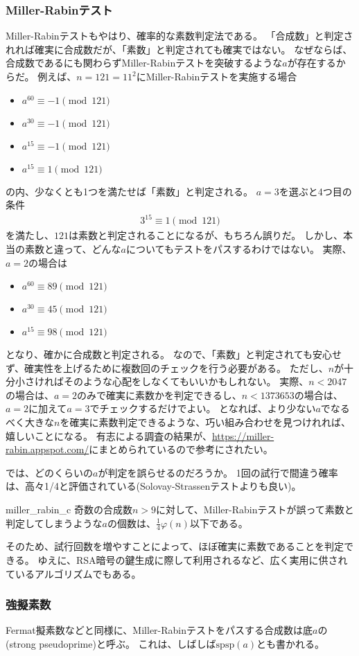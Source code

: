 \subsubsection{Miller-Rabinテスト}
Miller-Rabinテストもやはり、確率的な素数判定法である。
「合成数」と判定されれば確実に合成数だが、「素数」と判定されても確実ではない。
なぜならば、合成数であるにも関わらずMiller-Rabinテストを突破するような$a$が存在するからだ。
例えば、$n=121=11^2$にMiller-Rabinテストを実施する場合
\begin{itemize}
\item $a^{60} \equiv -1 \pmod{121}$
\item $a^{30} \equiv -1 \pmod{121}$
\item $a^{15} \equiv -1 \pmod{121}$
\item $a^{15} \equiv 1 \pmod{121}$
\end{itemize}
の内、少なくとも1つを満たせば「素数」と判定される。
$a=3$を選ぶと4つ目の条件
\begin{align*}
3^{15} \equiv 1 \pmod{121}
\end{align*}
を満たし、$121$は素数と判定されることになるが、もちろん誤りだ。
しかし、本当の素数と違って、どんな$a$についてもテストをパスするわけではない。
実際、$a=2$の場合は
\begin{itemize}
\item $a^{60} \equiv 89 \pmod{121}$
\item $a^{30} \equiv 45 \pmod{121}$
\item $a^{15} \equiv 98 \pmod{121}$
\end{itemize}
となり、確かに合成数と判定される。
なので、「素数」と判定されても安心せず、確実性を上げるために複数回のチェックを行う必要がある。
ただし、$n$が十分小さければそのような心配をしなくてもいいかもしれない。
実際、$n<2047$の場合は、$a=2$のみで確実に素数かを判定できるし、$n<1373653$の場合は、$a=2$に加えて$a=3$でチェックするだけでよい。
となれば、より少ない$a$でなるべく大きな$n$を確実に素数判定できるような、巧い組み合わせを見つけれれば、嬉しいことになる。
有志による調査の結果が、\url{https://miller-rabin.appspot.com/}にまとめられているので参考にされたい。



では、どのくらいの$a$が判定を誤らせるのだろうか。
1回の試行で間違う確率は、高々1/4と評価されている(Solovay-Strassenテストよりも良い)。

\begin{Prop}{}{miller_rabin_c}
奇数の合成数$n>9$に対して、Miller-Rabinテストが誤って素数と判定してしまうような$a$の個数は、$\frac{1}{4}\varphi(n)$以下である。
\end{Prop}

そのため、試行回数を増やすことによって、ほぼ確実に素数であることを判定できる。
ゆえに、RSA暗号の鍵生成に際して利用されるなど、広く実用に供されているアルゴリズムでもある。

\subsubsection{強擬素数}
Fermat擬素数などと同様に、Miller-Rabinテストをパスする合成数は底$a$の(strong pseudoprime)と呼ぶ。
これは、しばしば$\mbox{spsp}(a)$とも書かれる。


